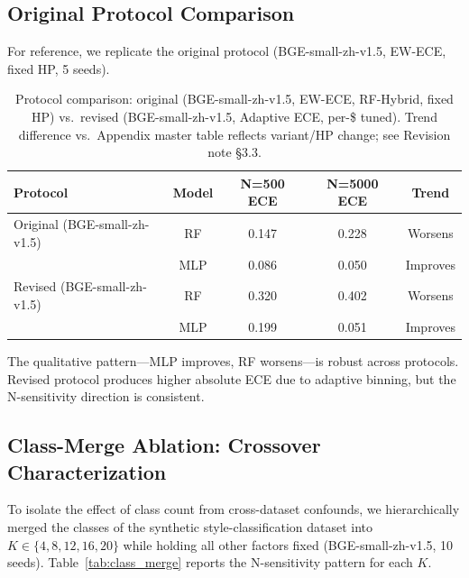 \documentclass[11pt]{article}
\begin{document}
\subsection{Original Protocol Comparison}

For reference, we replicate the original protocol (BGE-small-zh-v1.5, EW-ECE, fixed HP, 5 seeds).

\begin{table}[t]
\centering
\caption{Protocol comparison: original (BGE-small-zh-v1.5, EW-ECE, RF-Hybrid, fixed HP) vs.\ revised (BGE-small-zh-v1.5, Adaptive ECE, per-\$ tuned). Trend difference vs.\ Appendix master table reflects variant/HP change; see Revision note \S3.3.}
\label{tab:protocol_compare}
\begin{tabular}{@{}lcccc@{}}
\toprule
\textbf{Protocol} & \textbf{Model} & \textbf{N=500 ECE} & \textbf{N=5000 ECE} & \textbf{Trend} \\
\midrule
Original (BGE-small-zh-v1.5) & RF  & 0.147 & 0.228 & Worsens \\
                  & MLP & 0.086 & 0.050 & Improves \\
Revised (BGE-small-zh-v1.5)  & RF  & 0.320 & 0.402 & Worsens \\
                  & MLP & 0.199 & 0.051 & Improves \\
\bottomrule
\end{tabular}
\end{table}

The qualitative pattern---MLP improves, RF worsens---is robust across protocols. Revised protocol produces higher absolute ECE due to adaptive binning, but the N-sensitivity direction is consistent.

\subsection{Class-Merge Ablation: Crossover Characterization}

To isolate the effect of class count from cross-dataset confounds, we hierarchically merged the classes of the synthetic style-classification dataset into $K \in \{4, 8, 12, 16, 20\}$ while holding all other factors fixed (BGE-small-zh-v1.5, 10 seeds). Table~\ref{tab:class_merge} reports the N-sensitivity pattern for each $K$.
\end{document}
